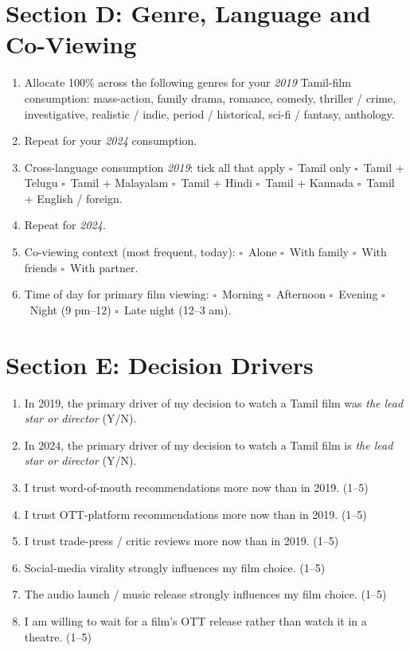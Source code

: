 \section*{Section D: Genre, Language and Co-Viewing}
\begin{enumerate}[resume,itemsep=2pt]
  \item Allocate 100\% across the following genres for your
        \emph{2019} Tamil-film consumption: mass-action, family drama,
        romance, comedy, thriller / crime, investigative,
        realistic / indie, period / historical, sci-fi / fantasy,
        anthology.
  \item Repeat for your \emph{2024} consumption.
  \item Cross-language consumption \emph{2019}: tick all that apply
        \quad $\square$~Tamil only \quad $\square$~Tamil + Telugu
        \quad $\square$~Tamil + Malayalam \quad $\square$~Tamil + Hindi
        \quad $\square$~Tamil + Kannada \quad $\square$~Tamil +
        English / foreign.
  \item Repeat for \emph{2024}.
  \item Co-viewing context (most frequent, today): $\square$~Alone
        \quad $\square$~With family \quad $\square$~With friends
        \quad $\square$~With partner.
  \item Time of day for primary film viewing: $\square$~Morning
        \quad $\square$~Afternoon \quad $\square$~Evening \quad
        $\square$~Night (9 pm--12) \quad $\square$~Late night (12--3 am).
\end{enumerate}

\section*{Section E: Decision Drivers}
\begin{enumerate}[resume,itemsep=2pt]
  \item In 2019, the primary driver of my decision to watch a
        Tamil film was \emph{the lead star or director} (Y/N).
  \item In 2024, the primary driver of my decision to watch a
        Tamil film is \emph{the lead star or director} (Y/N).
  \item I trust word-of-mouth recommendations more now than in
        2019. (1--5)
  \item I trust OTT-platform recommendations more now than in
        2019. (1--5)
  \item I trust trade-press / critic reviews more now than in
        2019. (1--5)
  \item Social-media virality strongly influences my film choice.
        (1--5)
  \item The audio launch / music release strongly influences my
        film choice. (1--5)
  \item I am willing to wait for a film's OTT release rather than
        watch it in a theatre. (1--5)
\end{enumerate}


